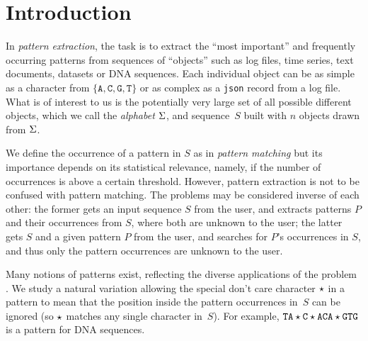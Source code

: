 \section{Introduction}\label{sec:introduction}
In \emph{pattern extraction}, the task is to extract the ``most important'' and frequently occurring patterns from sequences of ``objects'' such as log files, time series, text documents, datasets or DNA sequences. Each individual object can be as simple as a character from $\{ \mathtt{A}, \mathtt{C}, \mathtt{G}, \mathtt{T} \}$ or as complex as a \texttt{json} record from a log file. What is of interest to us is the potentially very large set of all possible different objects, which we call the \emph{alphabet} $\Sigma$, and  sequence~$S$ built with $n$ objects drawn from $\Sigma$. 

We define the occurrence of a pattern in $S$ as in \emph{pattern   matching} but its importance depends on its statistical relevance, namely, if the number of occurrences is above a certain threshold. However, pattern extraction is not to be confused with pattern matching. The problems may be considered inverse of each other: the former gets an input sequence $S$ from the user, and extracts patterns $P$ and their occurrences from $S$, where both are unknown to the user; the latter gets $S$ and a given pattern $P$ from the user, and searches for $P$'s occurrences in $S$, and thus only the pattern occurrences are unknown to the user.

Many notions of patterns exist, reflecting the diverse applications of the problem
\cite{grossi2011madmx, arimura2007efficient, sagot1998spelling, tcsUkkonen09}. We study a natural variation allowing the special don't care character $\star$ in a pattern to mean that the position inside the pattern occurrences in~$S$ can be ignored (so $\star$ matches any single character in~$S$). For example, $\mathtt{TA}\star\mathtt{C}\star \mathtt{ACA}\star \mathtt{GTG}$ is a pattern for DNA sequences.

